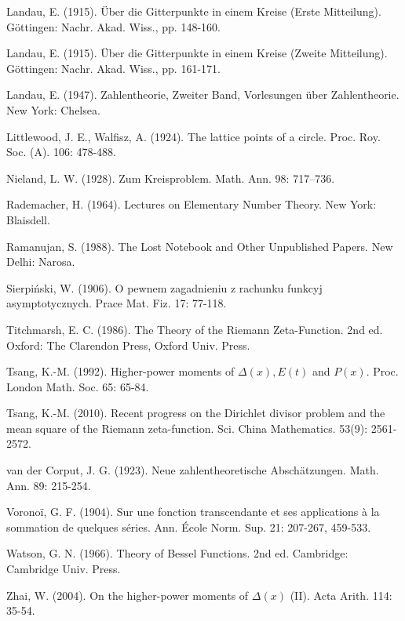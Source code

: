 \documentclass[10pt]{article}
\theoremstyle{plain}
\begin{document}
\begin{list}{}{\setlength{\leftmargin}{2.7em}\setlength{\labelwidth}{2.2em}\setlength{\itemindent}{-2.7em}\setlength{\itemsep}{0.25ex}\small}
  \item[{[27]}] Landau, E. (1915). Über die Gitterpunkte in einem Kreise (Erste Mitteilung). Göttingen: Nachr. Akad. Wiss., pp. 148-160.
  \item[{[28]}] Landau, E. (1915). Über die Gitterpunkte in einem Kreise (Zweite Mitteilung). Göttingen: Nachr. Akad. Wiss., pp. 161-171.
  \item[{[29]}] Landau, E. (1947). Zahlentheorie, Zweiter Band, Vorlesungen über Zahlentheorie. New York: Chelsea.
  \item[{[30]}] Littlewood, J. E., Walfisz, A. (1924). The lattice points of a circle. Proc. Roy. Soc. (A). 106: 478-488.
  \item[{[31]}] Nieland, L. W. (1928). Zum Kreisproblem. Math. Ann. 98: 717--736.
  \item[{[32]}] Rademacher, H. (1964). Lectures on Elementary Number Theory. New York: Blaisdell.
  \item[{[33]}] Ramanujan, S. (1988). The Lost Notebook and Other Unpublished Papers. New Delhi: Narosa.
  \item[{[34]}] Sierpiński, W. (1906). O pewnem zagadnieniu z rachunku funkcyj asymptotycznych. Prace Mat. Fiz. 17: 77-118.
  \item[{[35]}] Titchmarsh, E. C. (1986). The Theory of the Riemann Zeta-Function. 2nd ed. Oxford: The Clarendon Press, Oxford Univ. Press.
  \item[{[36]}] Tsang, K.-M. (1992). Higher-power moments of $\Delta(x), E(t)$ and $P(x)$. Proc. London Math. Soc. 65: 65-84.
  \item[{[37]}] Tsang, K.-M. (2010). Recent progress on the Dirichlet divisor problem and the mean square of the Riemann zeta-function. Sci. China Mathematics. 53(9): 2561-2572.
  \item[{[38]}] van der Corput, J. G. (1923). Neue zahlentheoretische Abschätzungen. Math. Ann. 89: 215-254.
  \item[{[39]}] Voronoï, G. F. (1904). Sur une fonction transcendante et ses applications à la sommation de quelques séries. Ann. École Norm. Sup. 21: 207-267, 459-533.
  \item[{[40]}] Watson, G. N. (1966). Theory of Bessel Functions. 2nd ed. Cambridge: Cambridge Univ. Press.
  \item[{[41]}] Zhai, W. (2004). On the higher-power moments of $\Delta(x)$ (II). Acta Arith. 114: 35-54.
\end{list}
\end{document}
